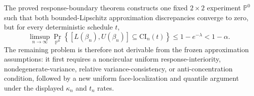 The proved response-boundary theorem constructs one fixed \(2\times2\) experiment \(\mathbb P^0\) such that both bounded-Lipschitz approximation discrepancies converge to zero, but for every deterministic schedule \(t\),
\[
\limsup_{n\to\infty}\Pr_{\mathbb P^0}\!\left\{[L(\beta_n),U(\beta_n)]\subseteq\mathrm{CI}_n(t)\right\}
\leq1-e^{-\lambda}<1-\alpha.
\]
The remaining problem is therefore not derivable from the frozen approximation assumptions: it first requires a noncircular uniform response-interiority, nondegenerate-variance, relative variance-consistency, or anti-concentration condition, followed by a new uniform face-localization and quantile argument under the displayed \(\kappa_n\) and \(t_n\) rates.
